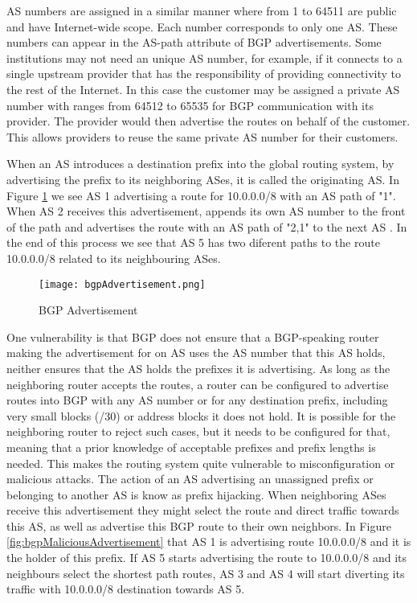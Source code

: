 \documentclass[11pt]{report}
\begin{document}
AS numbers are assigned in a similar manner where from 1 to 64511 are public and have Internet-wide scope. Each number corresponds to only one AS. These numbers can appear in the AS-path attribute of BGP advertisements. Some institutions may not need an unique AS number, for example, if it connects to a single upstream provider that has the responsibility of providing connectivity to the rest of the Internet. In this case the customer may be assigned a private AS number with ranges from 64512 to 65535 for BGP communication with its provider. The provider would then advertise the routes on behalf of the customer. This allows providers to reuse the same private AS number for their customers.

When an AS introduces a destination prefix into the global routing system, by advertising the prefix to its neighboring ASes, it is called the originating AS. In Figure \ref{fig:bgpAdvertisement} we see AS 1 advertising a route for 10.0.0.0/8 with an AS path of "1". When AS 2 receives this advertisement, appends its own AS number to the front of the path and advertises the route with an AS path of "2,1" to the next AS . In the end of this process we see that AS 5 has two diferent paths to the route 10.0.0.0/8 related to its neighbouring ASes.

\begin{figure}[h!]
\centering
\texttt{[image: bgpAdvertisement.png]}
\caption{BGP Advertisement}
\label{fig:bgpAdvertisement}
\end{figure}

One vulnerability is that BGP does not ensure that a BGP-speaking router making the advertisement for on AS uses the AS number that this AS holds, neither ensures that the AS holds the prefixes it is advertising. As long as the neighboring router accepts the routes, a router can be configured to advertise routes into BGP with any AS number or for any destination prefix, including very small blocks (/30) or address blocks it does not hold. It is possible for the neighboring router to reject such cases, but it needs to be configured for that, meaning that a prior knowledge of acceptable prefixes and prefix lengths is needed. This makes the routing system quite vulnerable to misconfiguration or malicious attacks. The action of an AS advertising an unassigned prefix or belonging to another AS is know as prefix hijacking. When neighboring ASes receive this advertisement they might select the route and direct traffic towards this AS, as well as advertise this BGP route to their own neighbors. In Figure \ref{fig:bgpMaliciousAdvertisement} that AS 1 is advertising route 10.0.0.0/8 and it is the holder of this prefix. If AS 5 starts advertising the route to 10.0.0.0/8 and its neighbours select the shortest path routes, AS 3 and AS 4 will start diverting its traffic with 10.0.0.0/8 destination towards AS 5.
\end{document}

